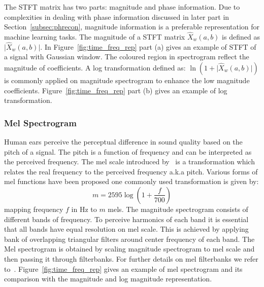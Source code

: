 The STFT matrix has two parts: magnitude and phase information. Due to complexities in dealing with phase information discussed in later part in Section~\ref{subsec:phrecon}, magnitude information is a preferable representation for machine learning tasks. The magnitude of a STFT matrix $\hat{X}_w(a,b)$ is defined as $\mathopen|\hat{X}_w(a,b)\mathclose|$.
In Figure~\ref{fig:time_freq_rep} part (a) gives an example of STFT of a signal with Gaussian window. The coloured region in spectrogram reflect the magnitude of coefficients. A log transformation defined as: $\ln(1+\mathopen|\hat{X}_w(a,b)\mathclose|)$ is commonly applied on magnitude spectrogram to enhance the low magnitude coefficients. Figure~\ref{fig:time_freq_rep} part (b) gives an example of log transformation.


\subsubsection{Mel Spectrogram}
Human ears perceive the perceptual difference in sound quality based on the pitch of a signal. The pitch is a function of frequency and can be interpreted as the perceived frequency. The mel scale introduced by~\cite{stevens1940relation} is a transformation which relates the real frequency to the perceived frequency a.k.a pitch. Various forms of mel functions have been proposed one commonly used transformation is given by:
\begin{equation}
    m = 2595 \log(1+\frac{f}{700})
\end{equation}
mapping frequency $f$ in Hz to $m$ mels.
The magnitude spectrogram consists of different bands of frequency. To perceive harmonics of each band it is essential that all bands have equal resolution on mel scale. This is achieved by applying bank of overlapping triangular filters around center frequency of each band. The Mel spectrogram is obtained by scaling magnitude spectrogram to mel scale and then passing it through filterbanks. For further details on mel filterbanks we refer to~\cite{kopparapu2010choice}. Figure~\ref{fig:time_freq_rep} gives an example of mel spectrogram and its comparison with the magnitude and log magnitude representation.

